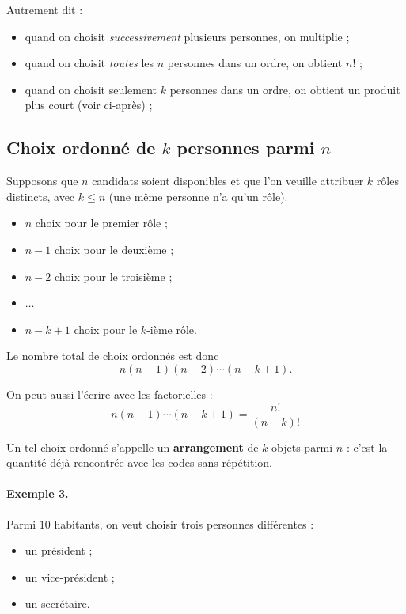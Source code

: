 \medskip

Autrement dit :
\begin{itemize}
    \item quand on choisit \emph{successivement} plusieurs personnes, on multiplie ;
    \item quand on choisit \emph{toutes} les \(n\) personnes dans un ordre, on obtient \(n!\) ;
    \item quand on choisit seulement \(k\) personnes dans un ordre, on obtient un produit plus court (voir ci-après) ;
\end{itemize}

\subsection{Choix ordonné de \(k\) personnes parmi \(n\)}

Supposons que \(n\) candidats soient disponibles et que l’on veuille attribuer
\(k\) rôles distincts, avec \(k\le n\) (une même personne n’a qu’un rôle).

\begin{itemize}
    \item \(n\) choix pour le premier rôle ;
    \item \(n-1\) choix pour le deuxième ;
    \item \(n-2\) choix pour le troisième ;
    \item \(\dots\)
    \item \(n-k+1\) choix pour le \(k\)-ième rôle.
\end{itemize}

Le nombre total de choix ordonnés est donc
\[
n(n-1)(n-2)\cdots (n-k+1).
\]

On peut aussi l’écrire avec les factorielles :
\[
\boxed{n(n-1)\cdots(n-k+1)=\frac{n!}{(n-k)!}}
\]

Un tel choix ordonné s’appelle un \textbf{arrangement} de \(k\) objets parmi \(n\) : c’est la
quantité déjà rencontrée avec les codes sans répétition.

\paragraph{Exemple 3.}
Parmi \(10\) habitants, on veut choisir trois personnes différentes :
\begin{itemize}
    \item un président ;
    \item un vice-président ;
    \item un secrétaire.
\end{itemize}

